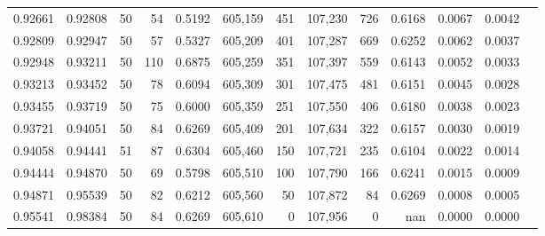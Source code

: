 \begin{tabular}{rrrrrrrrrrrrr}
0.92661 & 0.92808 &    50 &  54 &                                     0.5192 & 605,159 &     451 & 107,230 &     726 & 0.6168 & 0.0067 & 0.0042 \\
0.92809 & 0.92947 &    50 &  57 &                                     0.5327 & 605,209 &     401 & 107,287 &     669 & 0.6252 & 0.0062 & 0.0037 \\
0.92948 & 0.93211 &    50 & 110 &                                     0.6875 & 605,259 &     351 & 107,397 &     559 & 0.6143 & 0.0052 & 0.0033 \\
0.93213 & 0.93452 &    50 &  78 &                                     0.6094 & 605,309 &     301 & 107,475 &     481 & 0.6151 & 0.0045 & 0.0028 \\
0.93455 & 0.93719 &    50 &  75 &                                     0.6000 & 605,359 &     251 & 107,550 &     406 & 0.6180 & 0.0038 & 0.0023 \\
0.93721 & 0.94051 &    50 &  84 &                                     0.6269 & 605,409 &     201 & 107,634 &     322 & 0.6157 & 0.0030 & 0.0019 \\
0.94058 & 0.94441 &    51 &  87 &                                     0.6304 & 605,460 &     150 & 107,721 &     235 & 0.6104 & 0.0022 & 0.0014 \\
0.94444 & 0.94870 &    50 &  69 &                                     0.5798 & 605,510 &     100 & 107,790 &     166 & 0.6241 & 0.0015 & 0.0009 \\
0.94871 & 0.95539 &    50 &  82 &                                     0.6212 & 605,560 &      50 & 107,872 &      84 & 0.6269 & 0.0008 & 0.0005 \\
0.95541 & 0.98384 &    50 &  84 &                                     0.6269 & 605,610 &       0 & 107,956 &       0 &    nan & 0.0000 & 0.0000 \\
\bottomrule
\end{tabular}

